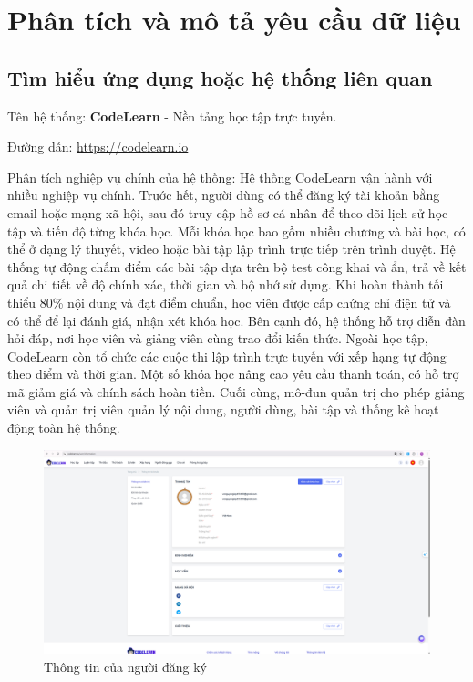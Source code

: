 \section{Phân tích và mô tả yêu cầu dữ liệu}
\subsection{Tìm hiểu ứng dụng hoặc hệ thống liên quan}
Tên hệ thống: \textbf{CodeLearn} - Nền tảng học tập trực tuyến.

Đường dẫn: \url{https://codelearn.io}

Phân tích nghiệp vụ chính của hệ thống: Hệ thống CodeLearn vận hành với nhiều nghiệp vụ chính. Trước hết, người dùng có thể đăng ký tài khoản bằng email hoặc mạng xã hội, sau đó truy cập hồ sơ cá nhân để theo dõi lịch sử học tập và tiến độ từng khóa học. Mỗi khóa học bao gồm nhiều chương và bài học, có thể ở dạng lý thuyết, video hoặc bài tập lập trình trực tiếp trên trình duyệt. Hệ thống tự động chấm điểm các bài tập dựa trên bộ test công khai và ẩn, trả về kết quả chi tiết về độ chính xác, thời gian và bộ nhớ sử dụng. Khi hoàn thành tối thiểu 80\% nội dung và đạt điểm chuẩn, học viên được cấp chứng chỉ điện tử và có thể để lại đánh giá, nhận xét khóa học. Bên cạnh đó, hệ thống hỗ trợ diễn đàn hỏi đáp, nơi học viên và giảng viên cùng trao đổi kiến thức. Ngoài học tập, CodeLearn còn tổ chức các cuộc thi lập trình trực tuyến với xếp hạng tự động theo điểm và thời gian. Một số khóa học nâng cao yêu cầu thanh toán, có hỗ trợ mã giảm giá và chính sách hoàn tiền. Cuối cùng, mô-đun quản trị cho phép giảng viên và quản trị viên quản lý nội dung, người dùng, bài tập và thống kê hoạt động toàn hệ thống.

\begin{figure}[!htp]
    \centering
    \includegraphics[width=1\linewidth]{picture/minh_chung_1.png}
    \caption{Thông tin của người đăng ký}
\end{figure}

